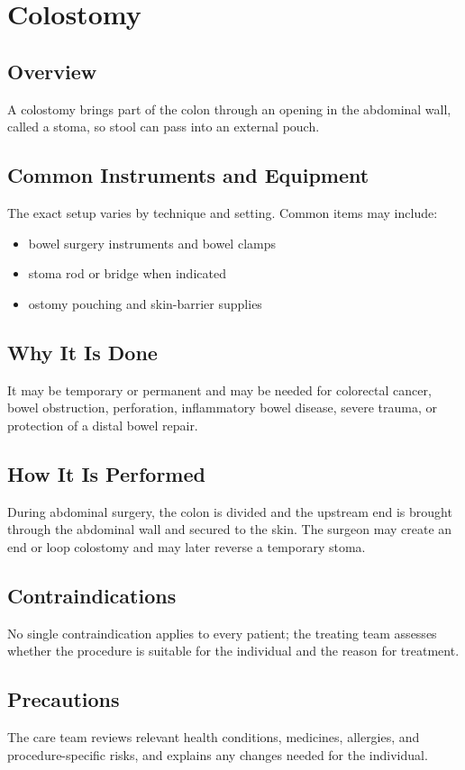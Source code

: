 \chapter{Colostomy}

\section*{Overview}
A colostomy brings part of the colon through an opening in the abdominal wall, called a stoma, so stool can pass into an external pouch.

\section*{Common Instruments and Equipment}
The exact setup varies by technique and setting. Common items may include:
\begin{itemize}[nosep,leftmargin=*]
  \item bowel surgery instruments and bowel clamps
  \item stoma rod or bridge when indicated
  \item ostomy pouching and skin-barrier supplies
\end{itemize}

\section*{Why It Is Done}
It may be temporary or permanent and may be needed for colorectal cancer, bowel obstruction, perforation, inflammatory bowel disease, severe trauma, or protection of a distal bowel repair.

\section*{How It Is Performed}
During abdominal surgery, the colon is divided and the upstream end is brought through the abdominal wall and secured to the skin. The surgeon may create an end or loop colostomy and may later reverse a temporary stoma.

\section*{Contraindications}
No single contraindication applies to every patient; the treating team assesses whether the procedure is suitable for the individual and the reason for treatment.

\section*{Precautions}
The care team reviews relevant health conditions, medicines, allergies, and procedure-specific risks, and explains any changes needed for the individual.


